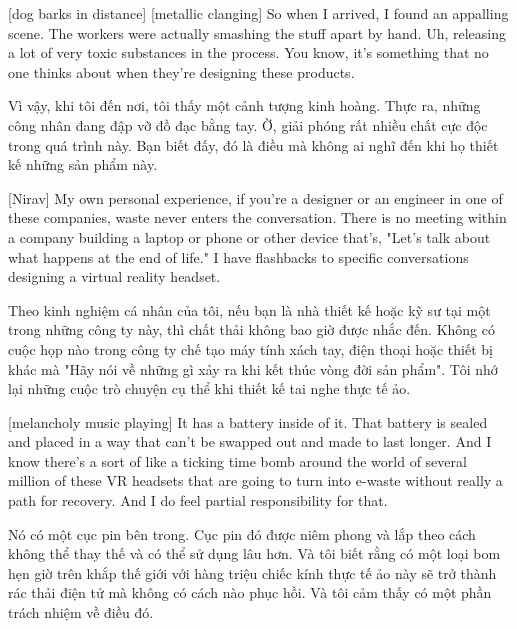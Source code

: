 \documentclass[a4paper]{article}
\begin{document}
	[dog barks in distance]
	[metallic clanging]
	So when I arrived, I found an appalling scene.
	The workers were actually smashing the stuff apart by hand.
	Uh, releasing a lot of very toxic substances in the process.
	You know, it's something that no one thinks about when they're designing these products.
	
	\begin{vietnamese-v2}
		Vì vậy, khi tôi đến nơi, tôi thấy một cảnh tượng kinh hoàng.
		Thực ra, những công nhân đang đập vỡ đồ đạc bằng tay.
		Ờ, giải phóng rất nhiều chất cực độc trong quá trình này.
		Bạn biết đấy, đó là điều mà không ai nghĩ đến khi họ thiết kế những sản phẩm này.
	\end{vietnamese-v2}
	
	[Nirav] My own personal experience, if you're a designer or an engineer in one of these companies, waste never enters the conversation.
	There is no meeting within a company building a laptop or phone or other device that's, "Let's talk about what happens at the end of life."
	I have flashbacks to specific conversations designing a virtual reality headset.
	
	
	\begin{vietnamese-v2}
		[Nirav] Theo kinh nghiệm cá nhân của tôi, nếu bạn là nhà thiết kế hoặc kỹ sư tại một trong những công ty này, thì chất thải không bao giờ được nhắc đến.
		Không có cuộc họp nào trong công ty chế tạo máy tính xách tay, điện thoại hoặc thiết bị khác mà "Hãy nói về những gì xảy ra khi kết thúc vòng đời sản phẩm".
		Tôi nhớ lại những cuộc trò chuyện cụ thể khi thiết kế tai nghe thực tế ảo.
	\end{vietnamese-v2}
	
	[melancholy music playing]
	It has a battery inside of it.
	That battery is sealed and placed in a way that can't be swapped out and made to last longer.
	And I know there's a sort of like a ticking time bomb around the world of several million of these VR headsets that are going to turn into e-waste without really a path for recovery.
	And I do feel partial responsibility for that.
	
	\begin{vietnamese-v2}
		Nó có một cục pin bên trong.
		Cục pin đó được niêm phong và lắp theo cách không thể thay thế và có thể sử dụng lâu hơn.
		Và tôi biết rằng có một loại bom hẹn giờ trên khắp thế giới với hàng triệu chiếc kính thực tế ảo này sẽ trở thành rác thải điện tử mà không có cách nào phục hồi.
		Và tôi cảm thấy có một phần trách nhiệm về điều đó.
	\end{vietnamese-v2}
	
\end{document}

